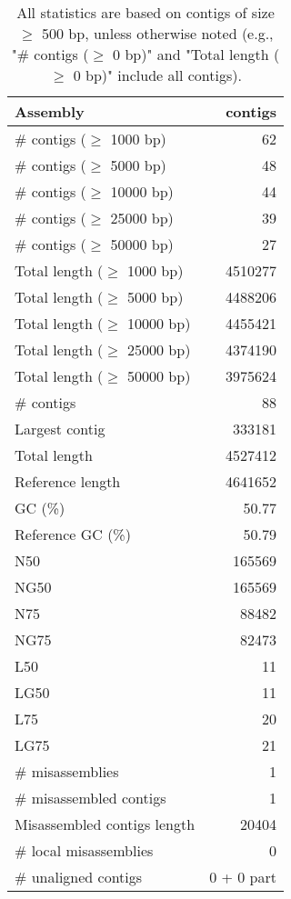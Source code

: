 \documentclass[12pt,a4paper]{article}
\begin{document}
\begin{table}[ht]
\begin{center}
\caption{All statistics are based on contigs of size $\geq$ 500 bp, unless otherwise noted (e.g., "\# contigs ($\geq$ 0 bp)" and "Total length ($\geq$ 0 bp)" include all contigs).}
\begin{tabular}{|l*{1}{|r}|}
\hline
Assembly & contigs \\ \hline
\# contigs ($\geq$ 1000 bp) & 62 \\ \hline
\# contigs ($\geq$ 5000 bp) & 48 \\ \hline
\# contigs ($\geq$ 10000 bp) & 44 \\ \hline
\# contigs ($\geq$ 25000 bp) & 39 \\ \hline
\# contigs ($\geq$ 50000 bp) & 27 \\ \hline
Total length ($\geq$ 1000 bp) & 4510277 \\ \hline
Total length ($\geq$ 5000 bp) & 4488206 \\ \hline
Total length ($\geq$ 10000 bp) & 4455421 \\ \hline
Total length ($\geq$ 25000 bp) & 4374190 \\ \hline
Total length ($\geq$ 50000 bp) & 3975624 \\ \hline
\# contigs & 88 \\ \hline
Largest contig & 333181 \\ \hline
Total length & 4527412 \\ \hline
Reference length & 4641652 \\ \hline
GC (\%) & 50.77 \\ \hline
Reference GC (\%) & 50.79 \\ \hline
N50 & 165569 \\ \hline
NG50 & 165569 \\ \hline
N75 & 88482 \\ \hline
NG75 & 82473 \\ \hline
L50 & 11 \\ \hline
LG50 & 11 \\ \hline
L75 & 20 \\ \hline
LG75 & 21 \\ \hline
\# misassemblies & 1 \\ \hline
\# misassembled contigs & 1 \\ \hline
Misassembled contigs length & 20404 \\ \hline
\# local misassemblies & 0 \\ \hline
\# unaligned contigs & 0 + 0 part \\ \hline

\end{tabular}
\end{center}
\end{table}
\end{document}
